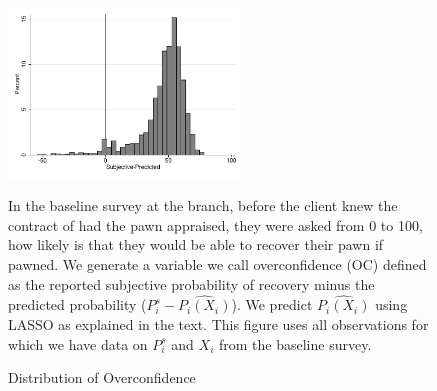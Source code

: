 \documentclass[oneside,11pt]{article}
\begin{document}
\begin{figure}[H]
        \caption{Distribution of Overconfidence}
    \label{oc_hist}
    \begin{center}
        \centering
        \includegraphics[width=0.55\textwidth]{Figuras/oc_hist.pdf}
    \end{center}
    \scriptsize
     In the baseline survey at the branch, before the client knew the contract of had the pawn appraised, they were asked from 0 to 100, how likely is that they would be able to recover their pawn if pawned. We generate a variable we call overconfidence (OC) defined as the reported subjective probability of recovery minus the predicted probability ($P^s_i-\widehat{P_i(X_i)}$). We predict $\widehat{P_i(X_i)}$ using LASSO as explained in the text. This figure uses all observations for which we have data on $P^s_i$ and $X_i$ from the baseline survey.
     
\end{figure}
\end{document}
